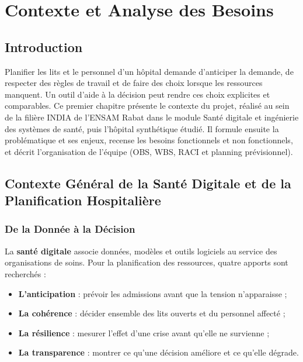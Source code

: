 \chapter{Contexte et Analyse des Besoins}
\label{ch:contexte_analyse_besoins}

\section*{Introduction}
Planifier les lits et le personnel d'un hôpital demande d'anticiper la demande, de respecter des règles de travail et de faire des choix lorsque les ressources manquent. Un outil d'aide à la décision peut rendre ces choix explicites et comparables. Ce premier chapitre présente le contexte du projet, réalisé au sein de la filière INDIA de l'ENSAM Rabat dans le module Santé digitale et ingénierie des systèmes de santé, puis l'hôpital synthétique étudié. Il formule ensuite la problématique et ses enjeux, recense les besoins fonctionnels et non fonctionnels, et décrit l'organisation de l'équipe (OBS, WBS, RACI et planning prévisionnel).

\section{Contexte Général de la Santé Digitale et de la Planification Hospitalière}

\subsection{De la Donnée à la Décision}
La \textbf{santé digitale} associe données, modèles et outils logiciels au service des organisations de soins. Pour la planification des ressources, quatre apports sont recherchés :
\begin{itemize}
    \item \textbf{L'anticipation} : prévoir les admissions avant que la tension n'apparaisse ;
    \item \textbf{La cohérence} : décider ensemble des lits ouverts et du personnel affecté ;
    \item \textbf{La résilience} : mesurer l'effet d'une crise avant qu'elle ne survienne ;
    \item \textbf{La transparence} : montrer ce qu'une décision améliore et ce qu'elle dégrade.
\end{itemize}

